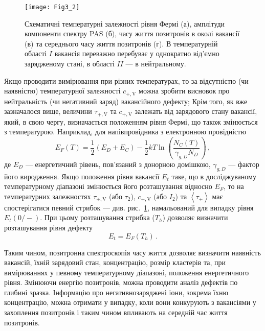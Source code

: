 \begin{figure}[!b]
\center
\vspace{-5mm}
\texttt{[image: Fig3\_2]}
\vspace{-3mm}
\caption{Схематичні температурні
залежності рівня Фермі (а),
амплітуди компоненти спектру PAS (б),
часу життя позитронів в околі вакансії (в)
та середнього часу життя позитронів (г).
В температурній області $I$ вакансія переважно
перебуває у однократно від'ємно зарядженому стані,
в області $II$ --- в нейтральному.
}
\vspace{-3mm}
\label{F32}
\end{figure}

Якщо проводити вимірювання при різних температурах, то
за відсутністю (чи наявністю) температурної залежності $c_{+,\mathrm{V}}$ можна зробити
висновок про нейтральність (чи негативний заряд) вакансійного дефекту;
Крім того, як вже зазначалося вище, величини $\tau_{+,\mathrm{V}}$ та $c_{+,\mathrm{V}}$ залежать від зарядового стану
вакансії, який, в свою чергу, визначається положенням рівня Фермі, що також змінюється з температурою.
Наприклад, для напівпровідника з електронною провідністю
\begin{equation}\label{EF}
E_F(T)=\frac{1}{2}(E_D+E_C)-\frac{1}{2}kT\ln\left(\frac{N_C(T)}{\gamma_{g,D}N_D}\right)\,,
\end{equation}
де
$E_D$ --- енергетичний рівень, пов'язаний з донорною домішкою,
$\gamma_{g,D}$ --- фактор його виродження.
Якщо положення рівня вакансії $E_{t}$ таке, що
в досліджуваному температурному діапазоні змінюється його розташування
відносно $E_F$, то на температурних залежностях $\tau_{+,\mathrm{V}}$ (або $\tau_2$),
$c_{+,\mathrm{V}}$ (або $I_2$) та $\left\langle\tau_+\right\rangle$
має спостерігатися певний стрибок --- див. рис.~\ref{F32}, намальований для випадку рівня  $E_t(0/-)$.
При цьому розташування стрибка ($T_{h}$) дозволяє визначити розташування рівня дефекту
\begin{equation}
E_t =E_F(T_{h})\,.
\end{equation}

Таким чином, позитронна спектроскопія часу життя дозволяє визначити наявність вакансій,
їхній зарядовий стан, концентрацію, розмір кластерів та, при вимірюваннях у певному температурному діапазоні,
положення енергетичного рівня.
Змінюючи енергію позитронів, можна проводити аналіз дефектів по глибині зразка.
Інформацію про негативнозаряджені іони, зокрема їхню концентрацію,
можна отримати у випадку, коли вони конкурують з вакансіями у захоплення позитронів і таким чином впливають на середній час життя позитронів.

